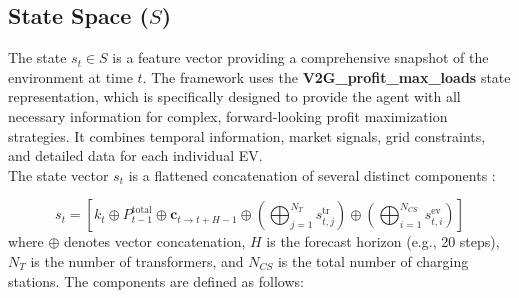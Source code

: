 \subsection{State Space ($S$)}
The state $s_t \in S$ is a feature vector providing a comprehensive snapshot of the environment at time $t$. The framework uses the \textbf{V2G\_profit\_max\_loads} state representation, which is specifically designed to provide the agent with all necessary information for complex, forward-looking profit maximization strategies. It combines temporal information, market signals, grid constraints, and detailed data for each individual EV.
\\
\noindent
The state vector $s_t$ is a flattened concatenation of several distinct components \cite{orfanoudakis2024ev2gym}:

\begin{equation}
    s_t = [k_t \oplus P_{t-1}^{\text{total}} \oplus \mathbf{c}_{t \rightarrow t+H-1} \oplus (\bigoplus_{j=1}^{N_T} s_{t,j}^{\text{tr}}) \oplus (\bigoplus_{i=1}^{N_{CS}} s_{t,i}^{\text{ev}})]
\end{equation}
where $\oplus$ denotes vector concatenation, $H$ is the forecast horizon (e.g., 20 steps), $N_T$ is the number of transformers, and $N_{CS}$ is the total number of charging stations.
\noindent
The components are defined as follows:

